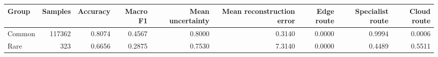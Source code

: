 \begin{tabular}{lrrrrrrrr}
\toprule
Group & Samples & Accuracy & Macro F1 & Mean uncertainty & Mean reconstruction error & Edge route & Specialist route & Cloud route \\
\midrule
Common & 117362 & 0.8074 & 0.4567 & 0.8000 & 0.3140 & 0.0000 & 0.9994 & 0.0006 \\
Rare & 323 & 0.6656 & 0.2875 & 0.7530 & 7.3140 & 0.0000 & 0.4489 & 0.5511 \\
\bottomrule
\end{tabular}
